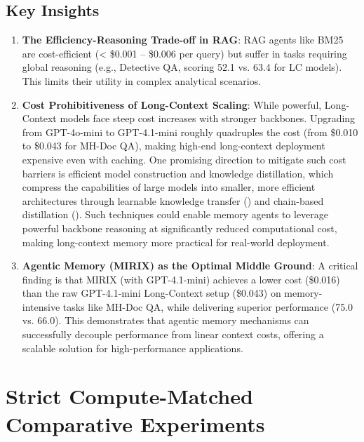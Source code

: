 \subsection{Key Insights}
\begin{enumerate}
    \item \textbf{The Efficiency-Reasoning Trade-off in RAG}: RAG agents like BM25 are cost-efficient (< \$0.001 – \$0.006 per query) but suffer in tasks requiring global reasoning (e.g., Detective QA, scoring 52.1 vs. 63.4 for LC models). This limits their utility in complex analytical scenarios.
    \item \textbf{Cost Prohibitiveness of Long-Context Scaling}: While powerful, Long-Context models face steep cost increases with stronger backbones. Upgrading from GPT-4o-mini to GPT-4.1-mini roughly quadruples the cost (from \$0.010 to \$0.043 for MH-Doc QA), making high-end long-context deployment expensive even with caching. One promising direction to mitigate such cost barriers is efficient model construction and knowledge distillation, which compress the capabilities of large models into smaller, more efficient architectures through learnable knowledge transfer (\cite{shi2024building}) and chain-based distillation (\cite{shi2026chainbaseddistillationeffectiveinitialization}). Such techniques could enable memory agents to leverage powerful backbone reasoning at significantly reduced computational cost, making long-context memory more practical for real-world deployment.
    
    \item \textbf{Agentic Memory (MIRIX) as the Optimal Middle Ground}: A critical finding is that MIRIX (with GPT-4.1-mini) achieves a lower cost (\$0.016) than the raw GPT-4.1-mini Long-Context setup (\$0.043) on memory-intensive tasks like MH-Doc QA, while delivering superior performance (75.0 vs. 66.0). This demonstrates that agentic memory mechanisms can successfully decouple performance from linear context costs, offering a scalable solution for high-performance applications.
\end{enumerate}

\section{Strict Compute-Matched Comparative Experiments}
\label{app:compute_matched}

